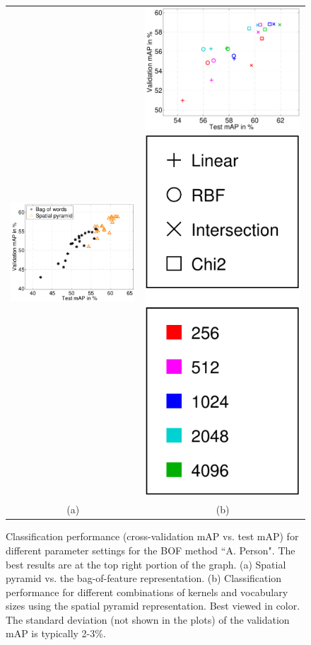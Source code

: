 \documentclass{bmvc2k}
\newcommand{\parnspc}{\vspace*{-4.2mm}}     %
\newcommand{\capnspc}{\vspace*{-4mm}}       %
\newcommand{\cfs}{\small}   %
\begin{document}
\begin{figure}[tbp]
\centering \small
\begin{tabular}{cc}
\includegraphics[height=.3\linewidth]{figs/caseA_error_BOF_PYR.pdf} &
\includegraphics[height=.3\linewidth]{figs/caseA_error_PYR.pdf}
\includegraphics[height=.3\linewidth]{figs/legend.pdf}\\
(a) & (b)  \\
\end{tabular}
\caption{\cfs Classification performance (cross-validation mAP vs. test mAP) for different parameter settings for the BOF method ``A. Person". The best results are at the top right portion of the graph.  (a) Spatial pyramid vs. the bag-of-feature representation.  (b) Classification performance for different combinations of kernels  and vocabulary sizes using the spatial pyramid representation.  Best viewed in color. The  standard deviation (not shown in the plots) of the validation mAP is typically 2-3\%. \normalsize 
}
 \label{fig:caseA}
 \capnspc
\end{figure}



\parnspc
\end{document}

